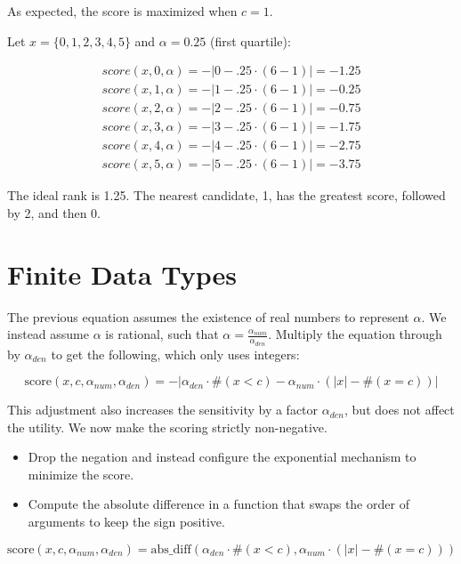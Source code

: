 \documentclass{article}
\begin{document}
As expected, the score is maximized when $c = 1$. 
 
Let $x = \{0,1,2,3,4,5\}$ and $\alpha = 0.25$ (first quartile): 
 
\begin{align*} 
    score(x, 0, \alpha) = -|0 - .25 \cdot (6 - 1)| = -1.25 \\ 
    score(x, 1, \alpha) = -|1 - .25 \cdot (6 - 1)| = -0.25 \\ 
    score(x, 2, \alpha) = -|2 - .25 \cdot (6 - 1)| = -0.75 \\ 
    score(x, 3, \alpha) = -|3 - .25 \cdot (6 - 1)| = -1.75 \\ 
    score(x, 4, \alpha) = -|4 - .25 \cdot (6 - 1)| = -2.75 \\ 
    score(x, 5, \alpha) = -|5 - .25 \cdot (6 - 1)| = -3.75 
\end{align*} 
 
The ideal rank is 1.25. The nearest candidate, 1, has the greatest score, followed by 2, and then 0.  
 
 
\section{Finite Data Types} 
The previous equation assumes the existence of real numbers to represent $\alpha$. 
We instead assume $\alpha$ is rational, such that $\alpha = \frac{\alpha_{num}}{\alpha_{den}}$. 
Multiply the equation through by $\alpha_{den}$ to get the following,  
which only uses integers: 
 
\begin{equation} 
    \textrm{score}(x, c, \alpha_{num}, \alpha_{den}) = -|\alpha_{den} \cdot \#(x < c) - \alpha_{num} \cdot (|x| - \#(x = c))| 
\end{equation} 
 
This adjustment also increases the sensitivity by a factor $\alpha_{den}$,  
but does not affect the utility. 
We now make the scoring strictly non-negative. 
\begin{itemize} 
    \item Drop the negation and instead configure the exponential mechanism to minimize the score. 
    \item Compute the absolute difference in a function that swaps the order of arguments to keep the sign positive. 
\end{itemize} 
 
\begin{equation} 
    \textrm{score}(x, c, \alpha_{num}, \alpha_{den}) = \mathrm{abs\_diff}(\alpha_{den} \cdot \#(x < c), \alpha_{num} \cdot (|x| - \#(x = c))) 
\end{equation} 
 
\end{document}
